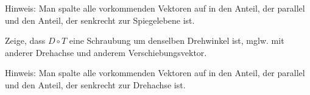 \begin{sheet}
\begin{subproblem}
Hinweis: Man spalte alle vorkommenden Vektoren auf in den Anteil, der parallel und den Anteil, der senkrecht zur Spiegelebene ist.
\end{subproblem}
\begin{subproblem}
Zeige, dass $D\circ T$ eine Schraubung um denselben Drehwinkel ist, mglw. mit anderer Drehachse und anderem Verschiebungsvektor.

Hinweis: Man spalte alle vorkommenden Vektoren auf in den Anteil, der parallel und den Anteil, der senkrecht zur Drehachse ist.
\end{subproblem}

\end{sheet}